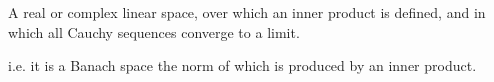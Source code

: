 A real or complex linear space, over which 
an inner product is defined, and in which all Cauchy
sequences converge to a limit.

\par
i.e. it is a Banach space the norm of which is 
produced by an inner product.